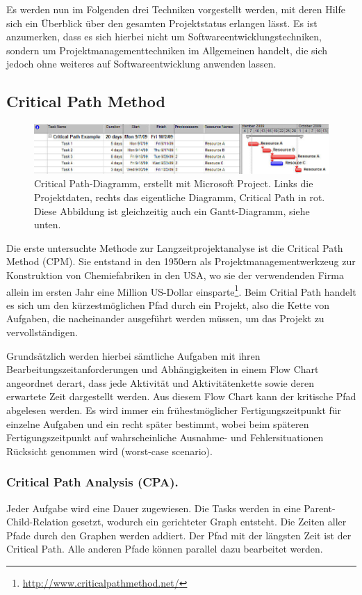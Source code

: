	Es werden nun im Folgenden drei Techniken vorgestellt werden, mit deren Hilfe sich ein Überblick über den gesamten Projektstatus erlangen lässt.
	Es ist anzumerken, dass es sich hierbei nicht um Softwareentwicklungstechniken, sondern um Projektmanagementtechniken im Allgemeinen handelt, die sich jedoch ohne weiteres auf Softwareentwicklung anwenden lassen.
	\subsection{Critical Path Method}
		\label{ssec:critical}
		\begin{figure}[ht]
			\begin{center}
				\includegraphics[width=\textwidth]{images/critical-path.jpg}
			\end{center}
			\caption{Critical Path-Diagramm, erstellt mit Microsoft Project. Links die Projektdaten, rechts das eigentliche Diagramm, Critical Path in rot. Diese Abbildung ist gleichzeitig auch ein Gantt-Diagramm, siehe unten.}
			\label{img:crit}
		\end{figure}
		Die erste untersuchte Methode zur Langzeitprojektanalyse ist die Critical Path Method (CPM).
		Sie entstand in den 1950ern als Projektmanagementwerkzeug zur Konstruktion von Chemiefabriken in den USA, wo sie der verwendenden Firma allein im ersten Jahr eine Million US-Dollar einsparte\footnote{
			\url{http://www.criticalpathmethod.net/}
		}.
		Beim Critial Path handelt es sich um den kürzestmöglichen Pfad durch ein Projekt, also die Kette von Aufgaben, die nacheinander ausgeführt werden müssen, um das Projekt zu vervollständigen.
		
		Grundsätzlich werden hierbei sämtliche Aufgaben mit ihren Bearbeitungszeitanforderungen und Abhängigkeiten in einem Flow Chart angeordnet derart, dass jede Aktivität und Aktivitätenkette sowie deren erwartete Zeit dargestellt werden.
		Aus diesem Flow Chart kann der kritische Pfad abgelesen werden.
		Es wird immer ein frühestmöglicher Fertigungszeitpunkt für einzelne Aufgaben und ein recht später bestimmt, wobei beim späteren Fertigungszeitpunkt auf wahrscheinliche Ausnahme- und Fehlersituationen Rücksicht genommen wird (worst-case scenario).
		
		\subsubsection{Critical Path Analysis (CPA).}
			\label{sssec:cpa}
			Jeder Aufgabe wird eine Dauer zugewiesen.
			Die Tasks werden in eine Parent-Child-Relation gesetzt, wodurch ein gerichteter Graph entsteht.
			Die Zeiten aller Pfade durch den Graphen werden addiert.
			Der Pfad mit der längsten Zeit ist der Critical Path.
			Alle anderen Pfade können parallel dazu bearbeitet werden.
